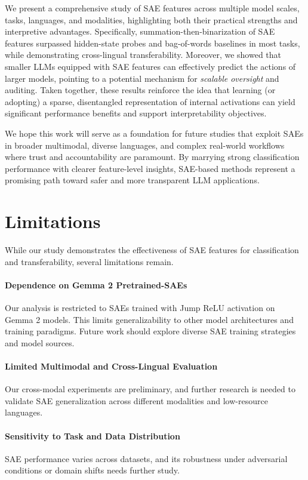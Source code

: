 We present a comprehensive study of SAE features across multiple model scales, tasks, languages, and modalities, highlighting both their practical strengths and interpretive advantages. Specifically, summation-then-binarization of SAE features surpassed hidden-state probes and bag-of-words baselines in most tasks, while demonstrating cross-lingual transferability. Moreover, we showed that smaller LLMs equipped with SAE features can effectively predict the actions of larger models, pointing to a potential mechanism for \emph{scalable oversight} and auditing. Taken together, these results reinforce the idea that learning (or adopting) a sparse, disentangled representation of internal activations can yield significant performance benefits and support interpretability objectives.

We hope this work will serve as a foundation for future studies that exploit SAEs in broader multimodal, diverse languages, and complex real-world workflows where trust and accountability are paramount. By marrying strong classification performance with clearer feature-level insights, SAE-based methods represent a promising path toward safer and more transparent LLM applications.

\section{Limitations}

While our study demonstrates the effectiveness of SAE features for classification and transferability, several limitations remain.

\paragraph{Dependence on Gemma 2 Pretrained-SAEs}  
Our analysis is restricted to SAEs trained with Jump ReLU activation on Gemma 2 models. This limits generalizability to other model architectures and training paradigms. Future work should explore diverse SAE training strategies and model sources.

\paragraph{Limited Multimodal and Cross-Lingual Evaluation}  
Our cross-modal experiments are preliminary, and further research is needed to validate SAE generalization across different modalities and low-resource languages.

\paragraph{Sensitivity to Task and Data Distribution}  
SAE performance varies across datasets, and its robustness under adversarial conditions or domain shifts needs further study.


